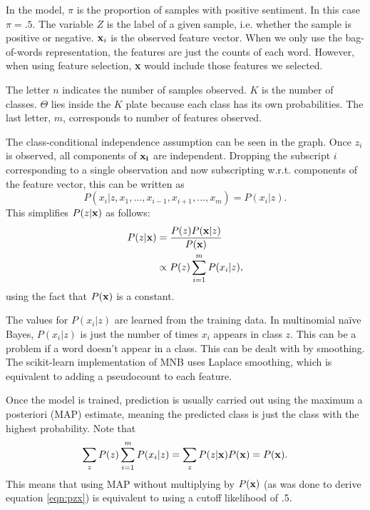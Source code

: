 \documentclass{article} %
\begin{document}
	In the model, $\pi$ is the proportion of samples with positive sentiment. In this case $\pi = .5$. The variable $Z$ is the label of a given sample, i.e. whether the sample is positive or negative. ${\bf x}_i$ is the observed feature vector. When we only use the bag-of-words representation, the features are just the counts of each word. However, when using feature selection, {\bf x} would include those features we selected.
	
	The letter $n$ indicates the number of samples observed. $K$ is the number of classes. $\Theta$ lies inside the $K$ plate because each class has its own probabilities. The last letter, $m$, corresponds to number of features observed. 
	
	The class-conditional independence assumption can be seen in the graph. Once $z_i$ is observed, all components of $\bf x_i$ are independent. Dropping the subscript $i$ corresponding to a single observation and now subscripting w.r.t. components of the feature vector, this can be written as 
	\begin{equation}
	P(x_i|z, x_1,\dots,x_{i-1}, x_{i+1}, \dots, x_m) = P(x_i|z).
	\end{equation}
	This simplifies $P(z|{\bf x})$ as follows:
	\begin{align}
	P(z|{\bf x}) &= \frac{P(z)P({\bf x}|z)}{P({\bf x})} \nonumber\\
	&\propto P(z)\sum_{i=1}^mP(x_i|z), \label{eqn:pzx}
	\end{align}
	using the fact that $P({\bf x})$ is a constant.
	
	The values for $P(x_i|z)$ are learned from the training data. In multinomial na\"ive Bayes, $P(x_i|z)$ is just the number of times $x_i$ appears in class $z$. This can be a problem if a word doesn't appear in a class. This can be dealt with by smoothing. The scikit-learn implementation of MNB uses Laplace smoothing, which is equivalent to adding a pseudocount to each feature. 
	
	Once the model is trained, prediction is usually carried out using the maximum a posteriori (MAP) estimate, meaning the predicted class is just the class with the highest probability. Note that 
	\begin{align}
	\sum_zP(z)\sum_{i=1}^mP(x_i|z) = \sum_zP(z|{\bf x})P({\bf x}) = P({\bf x}).
	\end{align}
	This means that using MAP without multiplying by $P({\bf x})$ (as was done to derive equation \ref{eqn:pzx}) is equivalent to using a cutoff likelihood of .5.
	
\end{document}
